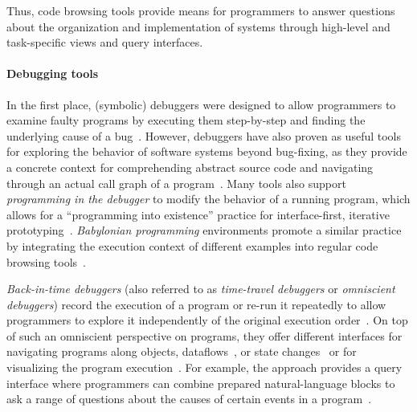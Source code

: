 	Thus, code browsing tools provide means for programmers to answer questions about the organization and implementation of systems through high-level and task-specific views and query interfaces.

	\paragraph{Debugging tools}
	\label{par:background/expsys/tools/debugging}
	In the first place, (symbolic) debuggers were designed to allow programmers to examine faulty programs by executing them step-by-step and finding the underlying cause of a bug~\cites[sec.~17.4]{goldberg1983smalltalk}[sec.~18f.]{goldberg1984smalltalk}.
	However, debuggers have also proven as useful tools for exploring the behavior of software systems beyond bug-fixing, as they provide a concrete context for comprehending abstract source code and navigating through an actual call graph of a program~\cite[sec.~6.4]{thiede2023squeak}.
	Many tools also support \emph{programming in the debugger} to modify the behavior of a running program, which allows for a ``programming into existence'' practice for interface-first, iterative prototyping~\cite{rosson1993active}.
	\emph{Babylonian programming} environments promote a similar practice by integrating the execution context of different examples into regular code browsing tools~\cite{rauch2019babylonian}.

	\emph{Back-in-time debuggers} (also referred to as \emph{time-travel debuggers} or \emph{omniscient debuggers}) record the execution of a program or re-run it repeatedly to allow programmers to explore it independently of the original execution order~\cite{lewis2003debugging,pothier2009back,perscheid2014follow}.
	On top of such an omniscient perspective on programs, they offer different interfaces for navigating programs along objects, dataflows~\cite{lienhard2009taking}, or state changes~\cite{thiede2023object,thiede2023time} or for visualizing the program execution~\cite{thiede2024bringing}. %
	For example, the  approach provides a query interface where programmers can combine prepared natural-language blocks to ask a range of questions about the causes of certain events in a program~\cite{ko2004designing}.


